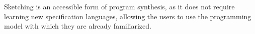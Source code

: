 Sketching is an accessible form of program synthesis, as it does not require
learning new specification languages, allowing the users to use the programming
model with which they are already familiarized.






